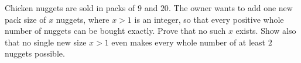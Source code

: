 Chicken nuggets are sold in packs of $9$ and $20$. The owner wants to add one new pack size of $x$ nuggets, where $x>1$ is an integer, so that every positive whole number of nuggets can be bought exactly. Prove that no such $x$ exists. Show also that no single new size $x>1$ even makes every whole number of at least $2$ nuggets possible.
